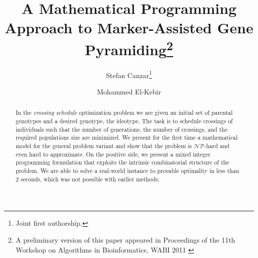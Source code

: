 \documentclass[runningheads]{llncs}
\begin{document}
\sloppy 
\title{A Mathematical Programming Approach to Marker-Assisted Gene Pyramiding\thanks{A preliminary version of this paper appeared in Proceedings of
 the 11th Workshop on Algorithms in Bioinformatics, WABI 2011 \cite{DBLP:conf/wabi/CanzarE11}}}
\author{
    Stefan Canzar\thanks{Joint first authorship.} \and Mohammed El-Kebir%
}




\maketitle

\begin{abstract}
In the \emph{crossing schedule} optimization problem we are given an initial set 
of parental genotypes and a desired genotype, the ideotype. The task is to schedule
crossings of individuals such that the number of generations, the number of crossings,
and the required populations size are minimized. We present for the first time a 
mathematical model for the general problem variant and show that the problem is 
$\mathcal{NP}$-hard and even hard to approximate. On the positive side, we present
a mixed integer programming formulation that exploits the intrinsic combinatorial structure 
of the problem. We are able to solve a real-world instance to provable optimality in less
than $2$ seconds, which was not possible with earlier methods.

%
%
\end{abstract}
\end{document}
